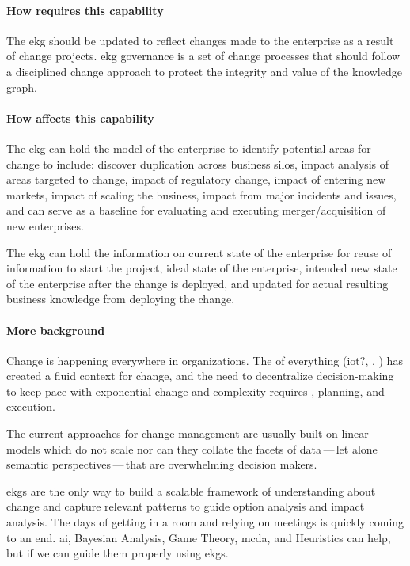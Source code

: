 %
%

\ekgmmContextSection

\paragraph*{How  requires this capability}
The \gls{ekg} should be updated to reflect changes made to the enterprise as a result of change projects.
\gls{ekg} governance is a set of change processes that should follow a
disciplined change approach to protect the integrity and value of the knowledge graph.

\paragraph{How  affects this capability}

The \gls{ekg} can hold the model of the enterprise to identify potential areas for change to include:
discover duplication across business silos, impact analysis of areas targeted to change,
impact of regulatory change, impact of entering new markets, impact of scaling the business,
impact from major incidents and issues, and can serve as a baseline for evaluating and executing
merger/acquisition of new enterprises.

The \gls{ekg} can hold the information on current state of the enterprise for reuse of information to start the
project, ideal state of the enterprise, intended new state of the enterprise after the change is deployed,
and updated for actual resulting business knowledge from deploying the change.

\paragraph*{More background}
Change is happening everywhere in organizations.
The  of everything (\gls{iot}?, , )
has created a fluid context for change, and the need to decentralize decision-making to keep pace with
exponential change and complexity requires , planning, and execution.

The current approaches for change management are usually built on linear models which do not scale nor can they collate
the facets of data\,---\,let alone semantic perspectives\,---\,that are overwhelming decision makers.

\Glspl{ekg} are the only way to build a scalable framework of understanding about change and capture relevant patterns
to guide option analysis and impact analysis.
The days of getting in a room and relying on meetings is quickly coming to an end.
\Gls{ai}, Bayesian Analysis, Game Theory, \gls{mcda},
and Heuristics can help, but  if we can guide them properly using \glspl{ekg}.

